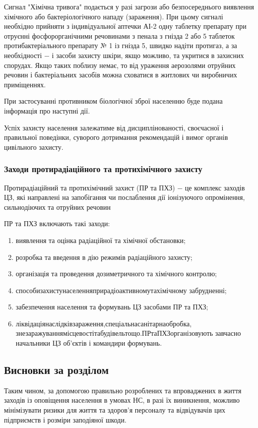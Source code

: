 Сигнал "Хімічна тривога" подається у разі загрози або безпосереднього виявлення хімічного або бактеріологічного нападу (зараження). При цьому сигналі необхідно прийняти з індивідуальної аптечки АІ-2 одну таблетку препарату при отруєнні фосфорорганічними речовинами з пенала з гнізда 2 або 5 таблеток протибактеріального препарату № 1 із гнізда 5, швидко надіти протигаз, а за необхідності $-$ і засоби захисту шкіри, якщо можливо, та укритися в захисних спорудах. Якщо таких поблизу немає, то від ураження аерозолями отруйних речовин і бактеріальних засобів можна сховатися в житлових чи виробничих приміщеннях.

При застосуванні противником біологічної зброї населенню буде подана інформація про наступні дії.

Успіх захисту населення залежатиме від дисциплінованості, своєчасної і правильної поведінки, суворого дотримання рекомендацій і вимог органів цивільного захисту.

\subsubsection{Заходи протирадіаційного та протихімічного захисту}

Протирадіаційний та протихімічний захист (ПР та ПХЗ) $-$ це комплекс заходів ЦЗ, які направлені на запобігання чи послаблення дії іонізуючого опромінення, сильнодіючих та отруйних речовин

ПР та ПХЗ включають такі заходи:

\begin{enumerate}
	\item виявлення та оцінка радіаційної та хімічної обстановки;
	\item розробка та введення в дію режимів радіаційного захисту;
	\item організація та проведення дозиметричного та хімічного контролю;
	\item способи\hfill захисту\hfill населення\hfill при\hfill радіоактивному\hfill та\hfill хімічному\newline \hspace*{-20mm} забрудненні;
	\item забезпечення населення та формувань ЦЗ засобами ПР та ПХЗ;
	\item ліквідація\hfill наслідків\hfill зараження,\hfill спеціальна\hfill санітарна\hfill обробка,\newline \hspace*{-20mm} знезаражування\hfill місцевості\hfill та\hfill будівель\hfill тощо.\hfill ПР\hfill та\hfill ПХЗ\hfill організовують\newline \hspace*{-20mm} завчасно начальники ЦЗ об’єктів і командири формувань.
\end{enumerate}

\subsection{Висновки за розділом}

Таким чином, за допомогою правильно розроблених та впроваджених в життя заходів із оповіщення населення в умовах НС, в разі їх виникнення, можливо мінімізувати ризики для життя та здоров’я персоналу та відвідувачів цих підприємств і розміри заподіяної шкоди. 
